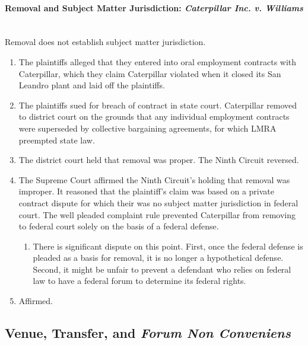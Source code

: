 \paragraph{Removal and Subject Matter Jurisdiction: \emph{Caterpillar Inc. v. 
Williams}\\\\}

Removal does not establish subject matter jurisdiction.

\begin{enumerate}
    \item The plaintiffs alleged that they entered into oral employment 
    contracts with Caterpillar, which they claim Caterpillar violated when it 
    closed its San Leandro plant and laid off the plaintiffs.
    \item The plaintiffs sued for breach of contract in state court. 
    Caterpillar removed to district court on the grounds that any individual 
    employment contracts were superseded by collective bargaining agreements, 
    for which LMRA preempted state law.
    \item The district court held that removal was proper. The Ninth Circuit 
    reversed.
    \item The Supreme Court affirmed the Ninth Circuit's holding that removal 
    was improper. It reasoned that the plaintiff's claim was based on a 
    private contract dispute for which their was no subject matter 
    jurisdiction in federal court. The well pleaded complaint rule prevented 
    Caterpillar from removing to federal court solely on the basis of a 
    federal defense.
    \begin{enumerate}
        \item There is significant dispute on this point. First, once the 
        federal defense is pleaded as a basis for removal, it is no longer a 
        hypothetical defense. Second, it might be unfair to prevent a 
        defendant who relies on federal law to have a federal forum to 
        determine its federal rights.
    \end{enumerate}
    \item Affirmed.
\end{enumerate}

\subsection{Venue, Transfer, and \emph{Forum Non Conveniens}}

